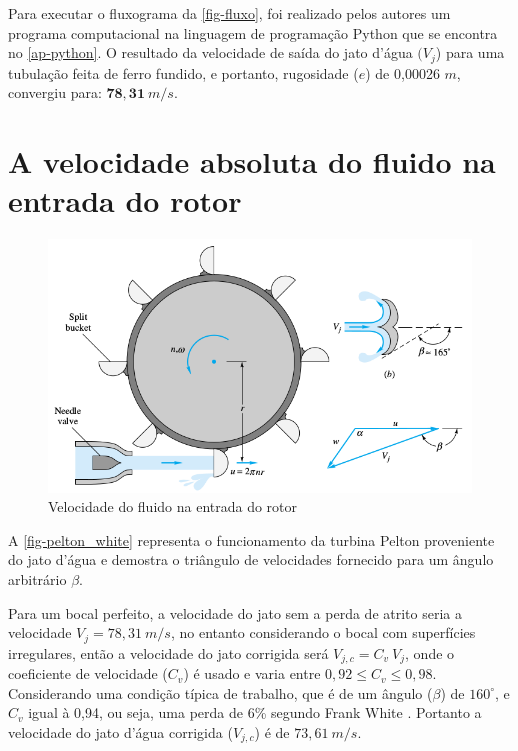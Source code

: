     Para executar o fluxograma da \autoref{fig-fluxo}, foi realizado pelos autores um programa computacional na linguagem de programação Python que se encontra no \autoref{ap-python}. O resultado da velocidade de saída do jato d'água $(V_j$) para uma tubulação feita de ferro fundido, e portanto, rugosidade ($e$) de 0,00026 $m$, convergiu para: $\mathbf{78,31\:} m/s$.

    \section{A velocidade absoluta do fluido na entrada do rotor}

    \begin{figure}[htb]
        \centering
        \caption{\label{fig-pelton_white} Velocidade do fluido na entrada do rotor}
        \includegraphics[scale=0.5]{images/pelton_turbine.png}
    \end{figure}
    A \autoref{fig-pelton_white} representa o funcionamento da turbina Pelton proveniente do jato d'água e demostra o triângulo de velocidades fornecido para um ângulo arbitrário $\beta$.

    Para um bocal perfeito, a velocidade do jato sem a perda de atrito seria a velocidade $V_j = 78,31 \: m/s$, no entanto considerando o bocal com superfícies irregulares, então a velocidade do jato corrigida será $V_{j,c} =  C_v \: V_{j}$, onde o coeficiente de velocidade ($C_v$) é usado e varia entre $0,92 \leq C_v \leq 0,98$. Considerando uma condição típica de trabalho, que é de um ângulo ($\beta$) de $160^{\circ}$, e $C_v$ igual à 0,94, ou seja, uma perda de 6\% segundo Frank White \cite{white}. Portanto a velocidade do jato d'água corrigida ($V_{j,c}$) é de  $73,61\: m/s$.

